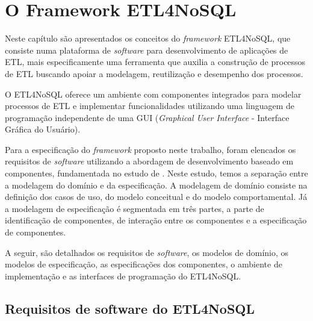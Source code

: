 \chapter{O Framework ETL4NoSQL}
Neste capítulo são apresentados os conceitos do \textit{framework} ETL4NoSQL, que consiste numa plataforma de \textit{software} para desenvolvimento de aplicações de ETL, mais especificamente uma ferramenta que auxilia a construção de processos de ETL buscando apoiar a modelagem, reutilização e desempenho dos processos. 

O ETL4NoSQL oferece um ambiente com componentes integrados para modelar processos de ETL e implementar funcionalidades utilizando uma linguagem de programação independente de uma GUI (\emph{Graphical User Interface} - Interface Gráfica do Usuário).


Para a especificação do \textit{framework} proposto neste trabalho, foram elencados os requisitos de \textit{software} utilizando a abordagem de desenvolvimento baseado em componentes, fundamentada no estudo de \cite{cheesman:2001}. Neste estudo, temos a separação entre a modelagem do domínio e da especificação. A modelagem de domínio consiste na definição dos casos de uso, do modelo conceitual e do modelo comportamental. Já a modelagem de especificação é segmentada em três partes, a parte de identificação de componentes, de interação entre os componentes e a especificação de componentes.  


A seguir, são detalhados os requisitos de \textit{software}, os modelos de domínio, os modelos de especificação, as especificações dos componentes, o ambiente de implementação e as interfaces de programação do ETL4NoSQL.


\clearpage
\section{Requisitos de software do ETL4NoSQL}



